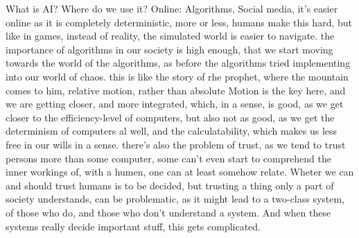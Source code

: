 What is AI?
Where do we use it?
Online: Algorithms, Social media, it's easier online as it is completely deterministic, more or less, humans make this hard, but like in games, instead of reality, the simulated world is easier to navigate.
the importance of algorithms in our society is high enough, that we start moving towards the world of the algorithms, as before the algorithms tried implementing into our world of chaos. 
this is like the story of rhe prophet, where the mountain comes to him, relative motion, rather than absolute Motion is the key here, and we are getting closer, and more integrated, which, in a sense, is good, as we get closer to the efficiency-level of computers, but also not as good, as we get the determinism of computers al well, and the calculatability, which makes us less free in our wills in a sense.
there's also the problem of trust, as we tend to trust persons more than some computer, some can't even start to comprehend the inner workings of, with a humen, one can at least somehow relate.
Wheter we can and should trust humans is to be decided, but trusting a thing only a part of society understands, can be problematic, as it might lead to a two-class system, of those who do, and those who don't understand a system. And when these systems really decide important stuff, this gets complicated.